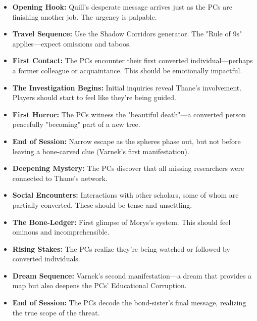 \documentclass[11pt,twoside]{book}
\newenvironment{adventurebox}[1]{%
  \begin{mdframed}[%
    linewidth=2pt,%
    linecolor=black,%
    backgroundcolor=gray!10,%
    innertopmargin=10pt,%
    innerbottommargin=10pt,%
    innerrightmargin=10pt,%
    innerleftmargin=10pt,%
    frametitle={#1},%
    frametitlefont=\sffamily\bfseries,%
  ]%
}{%
  \end{mdframed}%
}
\newcommand{\sessionbox}[2]{%
  \begin{adventurebox}{Session #1: #2}
}
\newcommand{\endsession}{%
  \end{adventurebox}
}
\begin{document}
\sessionbox{1}{Into the Valewood}
\begin{itemize}
    \item \textbf{Opening Hook:} Quill's desperate message arrives just as the PCs are finishing another job. The urgency is palpable.
    \item \textbf{Travel Sequence:} Use the Shadow Corridors generator. The "Rule of 9s" applies---expect omissions and taboos.
    \item \textbf{First Contact:} The PCs encounter their first converted individual---perhaps a former colleague or acquaintance. This should be emotionally impactful.
    \item \textbf{The Investigation Begins:} Initial inquiries reveal Thane's involvement. Players should start to feel like they're being guided.
    \item \textbf{First Horror:} The PCs witness the "beautiful death"---a converted person peacefully "becoming" part of a new tree.
    \item \textbf{End of Session:} Narrow escape as the spheres phase out, but not before leaving a bone-carved clue (Varnek's first manifestation).
\end{itemize}
\endsession

\sessionbox{2}{The Scholarly Web}
\begin{itemize}
    \item \textbf{Deepening Mystery:} The PCs discover that all missing researchers were connected to Thane's network.
    \item \textbf{Social Encounters:} Interactions with other scholars, some of whom are partially converted. These should be tense and unsettling.
    \item \textbf{The Bone-Ledger:} First glimpse of Morys's system. This should feel ominous and incomprehensible.
    \item \textbf{Rising Stakes:} The PCs realize they're being watched or followed by converted individuals.
    \item \textbf{Dream Sequence:} Varnek's second manifestation---a dream that provides a map but also deepens the PCs' Educational Corruption.
    \item \textbf{End of Session:} The PCs decode the bond-sister's final message, realizing the true scope of the threat.
\end{itemize}
\endsession
\end{document}
